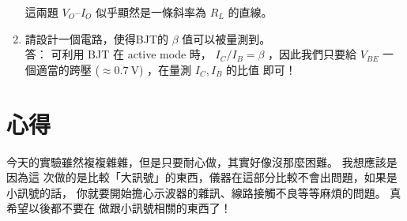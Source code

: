 \documentclass[12pt, a4paper]{article}
\begin{document}
\begin{enumerate}[itemsep=20pt, topsep=10pt]
\begin{figure}[H]
    \end{figure}
    這兩題 $V_O\text{--}I_O$ 似乎顯然是一條斜率為 $R_L$ 的直線。
  \item {請設計一個電路，使得BJT的 $\beta$ 值可以被量測到。} \\[10pt]
    答： 可利用 BJT 在 active mode 時， $I_C / I_B  = \beta$ ，因此我們只要給
    $V_{BE}$ 一個適當的跨壓 ($\approx \SI{0.7}\V$) ，在量測 $I_C, I_B$ 的比值
    即可！
    \begin{figure}[H]
      \centering
    \end{figure}
\end{enumerate}

\section{心得}
今天的實驗雖然複複雜雜，但是只要耐心做，其實好像沒那麼困難。 我想應該是因為這
次做的是比較「大訊號」的東西，儀器在這部分比較不會出問題，如果是小訊號的話，
你就要開始擔心示波器的雜訊、線路接觸不良等等麻煩的問題。 真希望以後都不要在
做跟小訊號相關的東西了！
\end{document}
